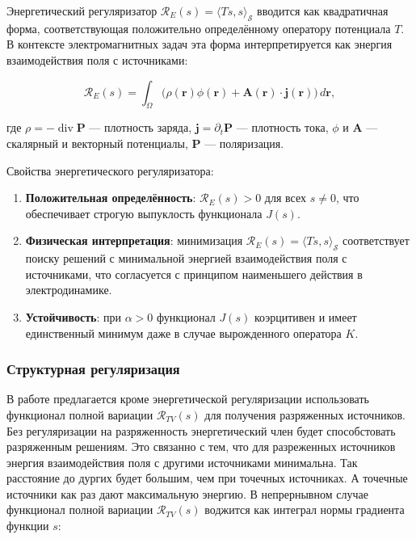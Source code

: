 \documentclass[a4paper,14pt,oneside,openany]{extarticle}
\begin{document}
Энергетический регуляризатор $\mathcal{R}_E(s) = \langle Ts, s \rangle_{\mathcal{S}}$ вводится как квадратичная форма, соответствующая положительно определённому оператору потенциала $T$. В контексте электромагнитных задач эта форма интерпретируется как энергия взаимодействия поля с источниками:

\begin{equation}
    \mathcal{R}_E(s) = \int_{\Omega} \bigl(\rho(\mathbf{r}) \phi(\mathbf{r}) + \mathbf{A}(\mathbf{r}) \cdot \mathbf{j}(\mathbf{r})\bigr) \, d\mathbf{r},
\end{equation}

где $\rho = -\operatorname{div} \mathbf{P}$ --- плотность заряда, $\mathbf{j} = \partial_t \mathbf{P}$ --- плотность тока, $\phi$ и $\mathbf{A}$ --- скалярный и векторный потенциалы, $\mathbf{P}$ --- поляризация.

Свойства энергетического регуляризатора:
\begin{enumerate}
    \item \textbf{Положительная определённость}: $\mathcal{R}_E(s) > 0$ для всех $s \neq 0$, что обеспечивает строгую выпуклость функционала $J(s)$.
    \item \textbf{Физическая интерпретация}: минимизация $\mathcal{R}_E(s) = \langle Ts, s \rangle_{\mathcal{S}}$ соответствует поиску решений с минимальной энергией взаимодействия поля с источниками, что согласуется с принципом наименьшего действия в электродинамике.
    \item \textbf{Устойчивость}: при $\alpha > 0$ функционал $J(s)$ коэрцитивен и имеет единственный минимум даже в случае вырожденного оператора $K$.
\end{enumerate}

\subsubsection{Структурная регуляризация}

В работе предлагается кроме энергетической регуляризации использовать функционал полной вариации $\mathcal{R}_{TV}(s)$
для получения разряженных источников. Без регуляризации на разряженность энергетический член будет способстовать разряженным решениям.
Это связанно с тем, что для разреженных источников энергия взаимодействия поля с другими источниками минимальна. Так расстояние до
дургих будет большим, чем при точечных источниках. А точечные источники как раз дают максимальную энергию.
В непрернывном случае функционал полной вариации $\mathcal{R}_{TV}(s)$ воджится как интеграл нормы градиента функции $s$: 
\end{document}
